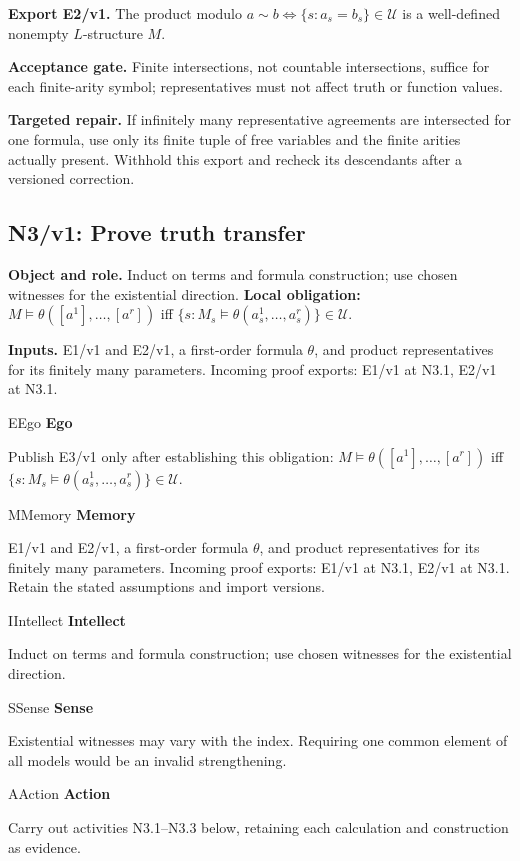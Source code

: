 \documentclass[preprint,12pt,aps,pra,showkeys,amsmath,amssymb,superscriptaddress,floatfix]{revtex4-2}
\theoremstyle{definition}
\theoremstyle{remark}
\newcommand{\mmfaculty}[3]{%
 \begin{mmfacultybox}{#1}{#2}
 {\sffamily\bfseries\color{MMBlue}#2}\par\smallskip #3
 \end{mmfacultybox}}
\newcommand{\field}[2]{\par\smallskip\noindent\textbf{#1.} #2\par}
\begin{document}
\field{Export E2/v1}{The product modulo \(a\sim b\iff\{s:a_s=b_s\}\in\mathcal U\) is a
well-defined nonempty \(L\)-structure \(M\).}

\field{Acceptance gate}{Finite intersections, not countable intersections, suffice for each
finite-arity symbol; representatives must not affect truth or function
values.}

\field{Targeted repair}{If infinitely many representative agreements are intersected for one
formula, use only its finite tuple of free variables and the finite
arities actually present. Withhold this export and recheck its
descendants after a versioned correction.}

\endgroup

\clearpage

\begingroup\linespread{1}\fontsize{9.5}{11}\selectfont\renewcommand{\small}{\fontsize{9.5}{11}\selectfont}

\subsection{N3/v1: Prove truth transfer}

\field{Object and role}{Induct on terms and formula construction; use chosen witnesses for the
existential direction. \textbf{Local obligation:}
\(M\models\theta([a^1],\ldots,[a^r])\) iff
\(\{s:M_s\models\theta(a_s^1,\ldots,a_s^r)\}\in\mathcal U\).}

\field{Inputs}{E1/v1 and E2/v1, a first-order formula \(\theta\), and product
representatives for its finitely many parameters. Incoming proof
exports: E1/v1 at N3.1, E2/v1 at N3.1.}

\mmfaculty{E}{Ego}{Publish E3/v1 only after establishing this obligation:
\(M\models\theta([a^1],\ldots,[a^r])\) iff
\(\{s:M_s\models\theta(a_s^1,\ldots,a_s^r)\}\in\mathcal U\).}

\mmfaculty{M}{Memory}{E1/v1 and E2/v1, a first-order formula \(\theta\), and product
representatives for its finitely many parameters. Incoming proof
exports: E1/v1 at N3.1, E2/v1 at N3.1. Retain the stated assumptions and
import versions.}

\mmfaculty{I}{Intellect}{Induct on terms and formula construction; use chosen witnesses for the
existential direction.}

\mmfaculty{S}{Sense}{Existential witnesses may vary with the index. Requiring one common
element of all models would be an invalid strengthening.}

\mmfaculty{A}{Action}{Carry out activities N3.1--N3.3 below, retaining each calculation and
construction as evidence.}
\end{document}

